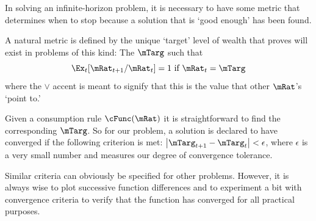 \documentclass[titlepage]{\econtex}
\begin{document}
In solving an infinite-horizon problem, it is necessary to have some
metric that determines when to stop because a solution that is `good
enough' has been found.

A natural metric is defined by the unique `target' level of wealth that \cite{BufferStockTheory} proves
will exist in problems of this kind: The $\mTarg$ such that
\begin{equation}
\Ex_t [{\mRat}_{t+1}/\mRat_t] = 1 \mbox{~if~} \mRat_t = \mTarg  \label{eq:mTarget}
\end{equation}
where the $\vee$ accent is meant to signify that this is the value
that other $\mRat$'s `point to.'

Given a consumption rule $\cFunc(\mRat)$ it is straightforward to find
the corresponding $\mTarg$.  So for our problem, a solution is declared
to have converged if the following criterion is met:
$\left|\mTarg_{t+1}-\mTarg_{t}\right| < \epsilon$, where $\epsilon$ is
a very small number and measures our degree of convergence tolerance.

Similar criteria can obviously be specified for other problems.
However, it is always wise to plot successive function differences and
to experiment a bit with convergence criteria to verify that the
function has converged for all practical purposes.
\end{document}
